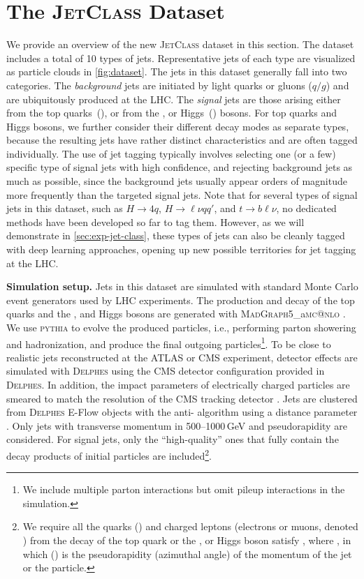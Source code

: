 \documentclass[nohyperref]{article}
\makeatletter
\theoremstyle{plain}
\theoremstyle{definition}
\theoremstyle{remark}
\newcommand{\jetclass}{{\textsc{JetClass}}\xspace}
\newcommand{\hqqqq}{\ensuremath{H\to 4 q}\xspace}
\newcommand{\hlvqq}{\ensuremath{H\to \ell \nu q q'}\xspace}
\newcommand{\tblv}{\ensuremath{t\to b \ell \nu}\xspace}
\newcommand{\qgj}{\ensuremath{q/g}\xspace}
\newcommand{\MADGRAPH}{\textsc{MadGraph}\xspace}
\newcommand{\MCATNLO} {\textsc{mc@nlo}\xspace}
\newcommand{\MGvATNLO}{\MADGRAPH{}5\_a\MCATNLO}
\newcommand{\PYTHIA} {{\textsc{pythia}}\xspace}
\newcommand{\DELPHES} {{\textsc{Delphes}}\xspace}
\makeatother
\begin{document}
\section{The \textsc{JetClass} Dataset}
\label{sec:dataset}

We provide an overview of the new \jetclass dataset in this section. The dataset includes a total of 10 types of jets. 
Representative jets of each type are visualized as particle clouds in \cref{fig:dataset}.
The jets in this dataset generally fall into two categories. 
The \textit{background} jets are initiated by light quarks or gluons (\qgj) and are ubiquitously produced at the LHC. 
The \textit{signal} jets are those arising either from the top quarks~(), or from the ,  or Higgs~() bosons. For top quarks and Higgs bosons, we further consider their different decay modes as separate types, because the resulting jets have rather distinct characteristics and are often tagged individually. 
The use of jet tagging typically involves selecting one (or a few) specific type of signal jets with high confidence, and rejecting background jets as much as possible, since the background jets usually appear orders of magnitude more frequently than the targeted signal jets. 
Note that for several types of signal jets in this dataset, such as \hqqqq, \hlvqq, and \tblv, no dedicated methods have been developed so far to tag them. However, as we will demonstrate in \cref{sec:exp-jet-class}, these types of jets can also be cleanly tagged with deep learning approaches, opening up new possible territories for jet tagging at the LHC.

\textbf{Simulation setup.} Jets in this dataset are simulated with standard Monte Carlo event generators used by LHC experiments. The production and decay of the top quarks and the ,  and Higgs bosons are generated with {\MGvATNLO} \cite{Alwall:2014hca}. We use \PYTHIA \cite{Sjostrand:2014zea} to evolve the produced particles, i.e., performing parton showering and hadronization, and produce the final outgoing particles\footnote{We include multiple parton interactions but omit pileup interactions in the simulation.}.
To be close to realistic jets reconstructed at the ATLAS or CMS experiment, detector effects are simulated with \DELPHES \cite{deFavereau:2013fsa} using the CMS detector configuration provided in \DELPHES. In addition, the impact parameters of electrically charged particles are smeared to match the resolution of the CMS tracking detector \cite{CMS:2014pgm}. Jets are clustered from \DELPHES E-Flow objects with the anti- algorithm \cite{Cacciari:2008gp, Cacciari:2011ma} using a distance parameter . Only jets with transverse momentum in 500--1000\,GeV and pseudorapidity  are considered. For signal jets, only the ``high-quality'' ones that fully contain the decay products of initial particles are included\footnote{We require all the quarks () and charged leptons (electrons or muons, denoted ) from the decay of the top quark or the ,  or Higgs boson satisfy , where , in which  () is the pseudorapidity (azimuthal angle) of the momentum of the jet or the particle.}. 
\end{document}

